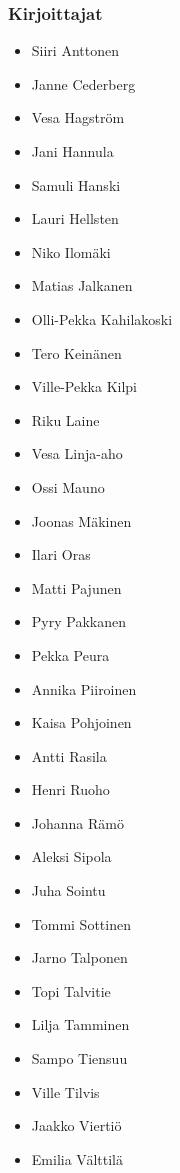 \subsubsection*{Kirjoittajat}
\begin{itemize}
\item Siiri Anttonen
\item Janne Cederberg
\item Vesa Hagström
\item Jani Hannula
\item Samuli Hanski
\item Lauri Hellsten
\item Niko Ilomäki
\item Matias Jalkanen
\item Olli-Pekka Kahilakoski
\item Tero Keinänen
\item Ville-Pekka Kilpi
\item Riku Laine
\item Vesa Linja-aho
\item Ossi Mauno
\item Joonas Mäkinen
\item Ilari Oras
\item Matti Pajunen
\item Pyry Pakkanen
\item Pekka Peura
\item Annika Piiroinen
\item Kaisa Pohjoinen
\item Antti Rasila
\item Henri Ruoho
\item Johanna Rämö
\item Aleksi Sipola
\item Juha Sointu
\item Tommi Sottinen
\item Jarno Talponen
\item Topi Talvitie
\item Lilja Tamminen
\item Sampo Tiensuu
\item Ville Tilvis
\item Jaakko Viertiö
\item Emilia Välttilä
\end{itemize}

\newpage

